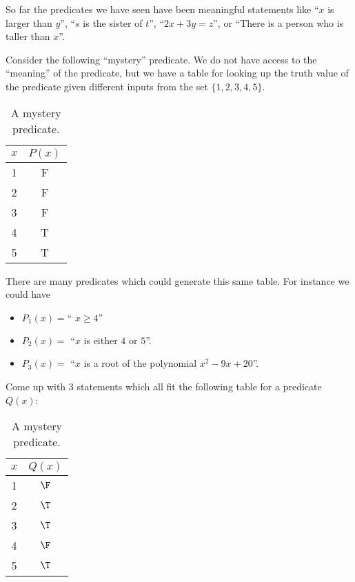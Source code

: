 	So far the predicates we have seen have been meaningful statements like ``$x$ is larger than $y$'', ``$s$ is the sister of $t$'', ``$2x+3y = z$'',  or ``There is a person who is taller than $x$''.

Consider the following ``mystery'' predicate.  We do not have access to the ``meaning'' of the predicate, but we have a table for looking up the truth value of the predicate given different inputs from the set $\{1,2,3,4,5\}$.

\begin{table}[h!]
	\begin{center}
		\caption{A mystery predicate.}
		\begin{tabular}{c|c} %
			
			$x$ & $P(x)$ \\
			\hline
			1 & F \\ 
			2 & F \\
			3 & F \\
			4 & T \\
			5 & T 
		\end{tabular}
	\end{center}
\end{table}

There are many predicates which could generate this same table.  For instance we could have

\begin{itemize}
	\item \(P_1(x) = \textrm{`` $x \geq 4$''}\)\\
	\item $P_2(x)=$ ``$x$ is either $4$ or $5$''.\\
	\item $P_3(x) =$ ``$x$ is a root of the polynomial $x^2 - 9x+20$''.\\
\end{itemize}

\begin{xca}
	Come up with 3 statements which all fit the following table for a predicate $Q(x)$:
	
	\begin{table}[h!]
		\begin{center}
			\caption{A mystery predicate.}
			\label{tab:table1}
			\begin{tabular}{c|c} %
				
				$x$ & $Q(x)$ \\
				\hline
				1 & $\F$ \\ 
				2 & $\T$ \\
				3 & $\T$ \\
				4 & $\F$ \\
				5 & $\T$ 
			\end{tabular}
		\end{center}
	\end{table}
	
\end{xca}


